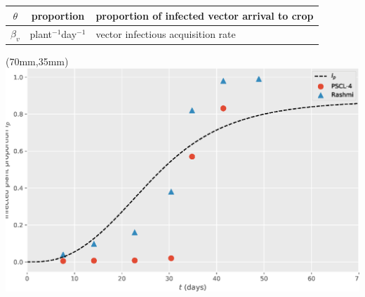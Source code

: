 \begin{frame}
{\begin{textblock*}{60mm}
\begin{tabular}{|c |c |l |}
					$\theta$ & proportion & proportion of infected vector arrival to crop  \\
					\hline
					$\beta_v$ & plant$^{-1}$day$^{-1}$ & vector infectious acquisition rate\\ 
					\hline
				\end{tabular}
			\end{textblock*}
		}
		{
			\begin{textblock*}{50mm}(70mm,35mm)
				\includegraphics[width=\linewidth]{Feathergraphics/Simulation_data.eps}
			\end{textblock*}
		}
	\end{frame}
